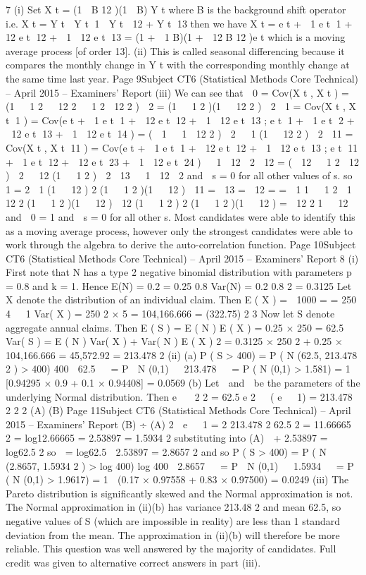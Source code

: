 7
(i)
Set X t = (1  B 12 )(1  B) Y t where B is the background shift operator
i.e. X t = Y t  Y t 1  Y t  12 + Y t 13
then we have X t = e t +  1 e t 1 +  12 e t 12 +  1  12 e t 13
= (1 +  1 B)(1 +  12 B 12 )e t
which is a moving average process [of order 13].
(ii)
This is called seasonal differencing because it compares the monthly change in
Y t with the corresponding monthly change at the same time last year.
Page 9Subject CT6 (Statistical Methods Core Technical) – April 2015 – Examiners’ Report
(iii)
We can see that
 0 = Cov(X t , X t ) = (1   1 2   12 2   1 2  12 2 )  2 = (1   1 2 )(1   12 2 )  2
 1 = Cov(X t , X t 1 ) = Cov(e t +  1 e t 1 +  12 e t 12 +  1  12 e t 13 ;
e t 1 +  1 e t 2 +  12 e t 13 +  1  12 e t 14 )
= (  1   1  12 2 )  2   1 (1   12 2 )  2
 11 = Cov(X t , X t 11 ) = Cov(e t +  1 e t 1 +  12 e t 12 +  1  12 e t 13 ;
e t 11 +  1 e t 12 +  12 e t 23 +  1  12 e t 24 )
  1  12  2
 12 = (  12   1 2  12 )  2   12 (1   1 2 )  2
 13   1  12  2
and  s = 0 for all other values of s.
so  1 =
2
 1 (1   12
)
2
(1   1 2 )(1   12
)
 11 =  13 =
 12 =
=
 1
1   1 2
 1  12
2
(1   1 2 )(1   12
)
 12 (1   1 2 )
2
(1   1 2 )(1   12
)
=
 12
2
1   12
and  0 = 1 and  s = 0 for all other s.
Most candidates were able to identify this as a moving average process, however only the
strongest candidates were able to work through the algebra to derive the auto-correlation
function.
Page 10Subject CT6 (Statistical Methods Core Technical) – April 2015 – Examiners’ Report
8
(i)
First note that N has a type 2 negative binomial distribution with parameters
p = 0.8 and k = 1. Hence
E(N) =
0.2
= 0.25
0.8
Var(N) =
0.2
0.8 2
= 0.3125
Let X denote the distribution of an individual claim. Then
E ( X ) =

1000
=
= 250
4
  1
Var( X ) = 250 2 ×
5
= 104,166.666 = (322.75) 2
3
Now let S denote aggregate annual claims. Then
E ( S )
= E ( N ) E ( X ) = 0.25 × 250 = 62.5
Var( S ) = E ( N ) Var( X ) + Var( N ) E ( X ) 2
= 0.3125 × 250 2 + 0.25 × 104,166.666
= 45,572.92 = 213.478 2
(ii)
(a)
P ( S > 400) = P ( N (62.5, 213.478 2 ) > 400)
400  62.5 

= P  N (0,1) 

213.478 

= P ( N (0,1) > 1.581)
= 1  [0.94295 × 0.9 + 0.1 × 0.94408]
= 0.0569
(b)
Let  and  be the parameters of the underlying Normal distribution.
Then
e

 2
2
= 62.5
e 2  ( e   1) = 213.478 2
2
2
(A)
(B)
Page 11Subject CT6 (Statistical Methods Core Technical) – April 2015 – Examiners’ Report
(B) ÷ (A) 2  e   1 =
2
213.478 2
62.5 2
= 11.66665
 2 = log12.66665 = 2.53897 = 1.5934 2
substituting into (A)  + 2.53897 = log62.5
2
so  = log62.5  2.53897 = 2.8657
2
and so P ( S > 400) = P ( N (2.8657, 1.5934 2 ) > log 400)
log 400  2.8657 

= P  N (0,1) 

1.5934


= P ( N (0,1) > 1.9617)
= 1  (0.17 × 0.97558 + 0.83 × 0.97500)
= 0.0249
(iii)
The Pareto distribution is significantly skewed and the Normal approximation
is not. The Normal approximation in (ii)(b) has variance 213.48 2 and mean
62.5, so negative values of S (which are impossible in reality) are less than 1
standard deviation from the mean.
The approximation in (ii)(b) will therefore be more reliable.
This question was well answered by the majority of candidates. Full credit was given to
alternative correct answers in part (iii).
